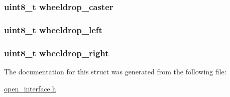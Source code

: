 \hypertarget{structoi__t_a29269b6b5ac74f91cb0ca6ec515e1bf0}{
\subsubsection[{wheeldrop\-\_\-caster}]{\setlength{\rightskip}{0pt plus 5cm}uint8\-\_\-t wheeldrop\-\_\-caster}}\label{structoi__t_a29269b6b5ac74f91cb0ca6ec515e1bf0}
\hypertarget{structoi__t_ab543a5270116bfe2f31a3b84cbed927b}{
\subsubsection[{wheeldrop\-\_\-left}]{\setlength{\rightskip}{0pt plus 5cm}uint8\-\_\-t wheeldrop\-\_\-left}}\label{structoi__t_ab543a5270116bfe2f31a3b84cbed927b}
\hypertarget{structoi__t_aa73acdcd8ac4389650026caf557884ad}{
\subsubsection[{wheeldrop\-\_\-right}]{\setlength{\rightskip}{0pt plus 5cm}uint8\-\_\-t wheeldrop\-\_\-right}}\label{structoi__t_aa73acdcd8ac4389650026caf557884ad}


The documentation for this struct was generated from the following file\-:\begin{DoxyCompactItemize}
\item 
\hyperlink{open__interface_8h}{open\-\_\-interface.\-h}\end{DoxyCompactItemize}
